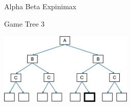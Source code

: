 \documentclass[twoside]{article}
\newcommand{\solutionspace}[4]{\fbox{\begin{minipage}[t][#1][t]{#2} \textbf{#3} 

\solution{}{#4} \end{minipage}}}
\begin{document}
\begin{problem}{Alpha Beta Expinimax}
\begin{question}[8]
\solutionspace{1cm}{15cm}{}
{\Fourb}

\end{question}

\begin{question}[8] Game Tree 3


\begin{center}
\includegraphics[width=2.5in]{alpha_beta_3.png}
\end{center}

\solutionspace{1cm}{15cm}{}
{\Fourc}

\end{question}

\end{problem}
\end{document}

